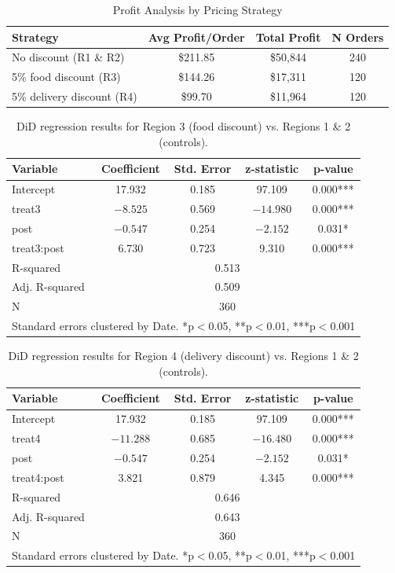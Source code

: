 \documentclass[12pt]{article}
\begin{document}
\begin{table}[H]
\centering
\caption{Profit Analysis by Pricing Strategy}
\label{tab:profit}
\begin{tabular}{lccc}
\toprule
\textbf{Strategy} & \textbf{Avg Profit/Order} & \textbf{Total Profit} & \textbf{N Orders} \\
\midrule
No discount (R1 \& R2) & \$211.85 & \$50,844 & 240 \\
5\% food discount (R3) & \$144.26 & \$17,311 & 120 \\
5\% delivery discount (R4) & \$99.70 & \$11,964 & 120 \\
\bottomrule
\end{tabular}
\end{table}

\begin{table}[H]
\centering
\small
\begin{tabular}{lcccc}
\toprule
\textbf{Variable} & \textbf{Coefficient} & \textbf{Std. Error} & \textbf{z-statistic} & \textbf{p-value} \\
\midrule
Intercept & 17.932 & 0.185 & 97.109 & 0.000*** \\
treat3 & $-8.525$ & 0.569 & $-14.980$ & 0.000*** \\
post & $-0.547$ & 0.254 & $-2.152$ & 0.031* \\
treat3:post & 6.730 & 0.723 & 9.310 & 0.000*** \\
\midrule
R-squared & \multicolumn{4}{c}{0.513} \\
Adj. R-squared & \multicolumn{4}{c}{0.509} \\
N & \multicolumn{4}{c}{360} \\
\bottomrule
\multicolumn{5}{l}{\footnotesize Standard errors clustered by Date. *p$<$0.05, **p$<$0.01, ***p$<$0.001}
\end{tabular}
\caption{DiD regression results for Region 3 (food discount) vs. Regions 1 \& 2 (controls).}
\label{tab:reg_r3}
\end{table}

\begin{table}[H]
\centering
\small
\begin{tabular}{lcccc}
\toprule
\textbf{Variable} & \textbf{Coefficient} & \textbf{Std. Error} & \textbf{z-statistic} & \textbf{p-value} \\
\midrule
Intercept & 17.932 & 0.185 & 97.109 & 0.000*** \\
treat4 & $-11.288$ & 0.685 & $-16.480$ & 0.000*** \\
post & $-0.547$ & 0.254 & $-2.152$ & 0.031* \\
treat4:post & 3.821 & 0.879 & 4.345 & 0.000*** \\
\midrule
R-squared & \multicolumn{4}{c}{0.646} \\
Adj. R-squared & \multicolumn{4}{c}{0.643} \\
N & \multicolumn{4}{c}{360} \\
\bottomrule
\multicolumn{5}{l}{\footnotesize Standard errors clustered by Date. *p$<$0.05, **p$<$0.01, ***p$<$0.001}
\end{tabular}
\caption{DiD regression results for Region 4 (delivery discount) vs. Regions 1 \& 2 (controls).}
\label{tab:reg_r4}
\end{table}
\end{document}
